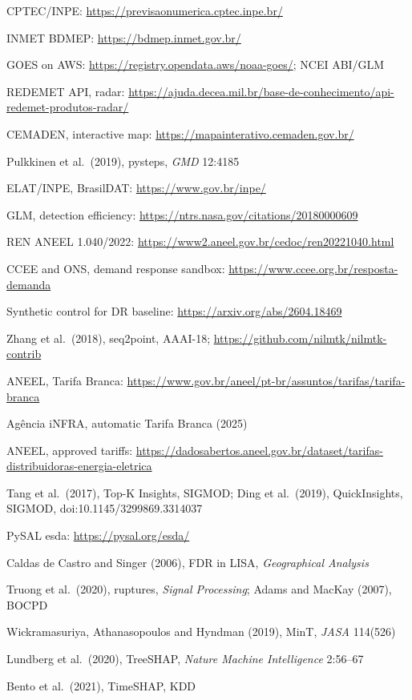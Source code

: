 {\begin{enumerate}[label={[\arabic*]},leftmargin=2.2em,itemsep=1pt]
\item CPTEC/INPE: \url{https://previsaonumerica.cptec.inpe.br/}
\item INMET BDMEP: \url{https://bdmep.inmet.gov.br/}
\item GOES on AWS: \url{https://registry.opendata.aws/noaa-goes/}; NCEI ABI/GLM
\item REDEMET API, radar: \url{https://ajuda.decea.mil.br/base-de-conhecimento/api-redemet-produtos-radar/}
\item CEMADEN, interactive map: \url{https://mapainterativo.cemaden.gov.br/}
\item Pulkkinen et al.\ (2019), pysteps, \emph{GMD} 12:4185
\item ELAT/INPE, BrasilDAT: \url{https://www.gov.br/inpe/}
\item GLM, detection efficiency: \url{https://ntrs.nasa.gov/citations/20180000609}
\item REN ANEEL 1.040/2022: \url{https://www2.aneel.gov.br/cedoc/ren20221040.html}
\item CCEE and ONS, demand response sandbox: \url{https://www.ccee.org.br/resposta-demanda}
\item Synthetic control for DR baseline: \url{https://arxiv.org/abs/2604.18469}
\item Zhang et al.\ (2018), seq2point, AAAI-18; \url{https://github.com/nilmtk/nilmtk-contrib}
\item ANEEL, Tarifa Branca: \url{https://www.gov.br/aneel/pt-br/assuntos/tarifas/tarifa-branca}
\item Agência iNFRA, automatic Tarifa Branca (2025)
\item ANEEL, approved tariffs: \url{https://dadosabertos.aneel.gov.br/dataset/tarifas-distribuidoras-energia-eletrica}
\item Tang et al.\ (2017), Top-K Insights, SIGMOD; Ding et al.\ (2019), QuickInsights, SIGMOD, doi:10.1145/3299869.3314037
\item PySAL esda: \url{https://pysal.org/esda/}
\item Caldas de Castro and Singer (2006), FDR in LISA, \emph{Geographical Analysis}
\item Truong et al.\ (2020), ruptures, \emph{Signal Processing}; Adams and MacKay (2007), BOCPD
\item Wickramasuriya, Athanasopoulos and Hyndman (2019), MinT, \emph{JASA} 114(526)
\item Lundberg et al.\ (2020), TreeSHAP, \emph{Nature Machine Intelligence} 2:56--67
\item Bento et al.\ (2021), TimeSHAP, KDD

\end{enumerate}}
